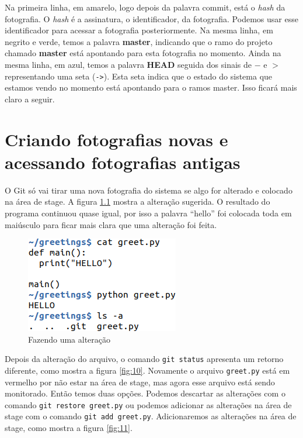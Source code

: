 \documentclass[a4paper]{book}
\begin{document}
Na primeira linha, em amarelo, logo depois da palavra commit,
está o \textit{hash} da fotografia.
O \textit{hash} é a assinatura, o identificador, da fotografia.
Podemos usar esse identificador para acessar a fotografia
posteriormente. Na mesma linha, em negrito e verde, temos a
palavra \textbf{master},
indicando que o ramo do projeto chamado \textbf{master} está
apontando para esta fotografia no momento.
Ainda na mesma linha, em azul, temos a palavra \textbf{HEAD} 
seguida
dos sinais de $-$ e $>$ representando uma seta (\texttt{->}).
Esta seta indica que o estado do sistema que estamos vendo no
momento está apontando para o ramos master.
Isso ficará mais claro a seguir.

\chapter{Criando fotografias novas e acessando fotografias antigas}

O Git só vai tirar uma nova fotografia do sistema se algo for 
alterado e colocado na área de stage.
A figura \ref{fig:09} mostra a alteração sugerida.
O resultado do programa continuou quase igual, por isso
a palavra ``hello'' foi colocada toda em maiúsculo 
para ficar mais clara que uma alteração foi feita.

\begin{figure}[ht]
\caption{Fazendo uma alteração}
\label{fig:09}
\centering
\includegraphics[scale=0.6,left]{"images/09-Fazendo uma alteração.png"}
\end{figure}

Depois da alteração do arquivo, o comando \texttt{git status}
apresenta um retorno diferente, como mostra a figura 
\ref{fig:10}.
Novamente o arquivo \texttt{greet.py} está em vermelho
por não estar na área de stage,
mas agora esse arquivo está sendo monitorado. 
Então temos duas opções.
Podemos descartar as alterações com o comando 
\texttt{git restore greet.py} ou podemos adicionar 
as alterações na área de stage com o comando
\texttt{git add greet.py}.
Adicionaremos as alterações na área de stage, como mostra a
figura \ref{fig:11}.
\end{document}
